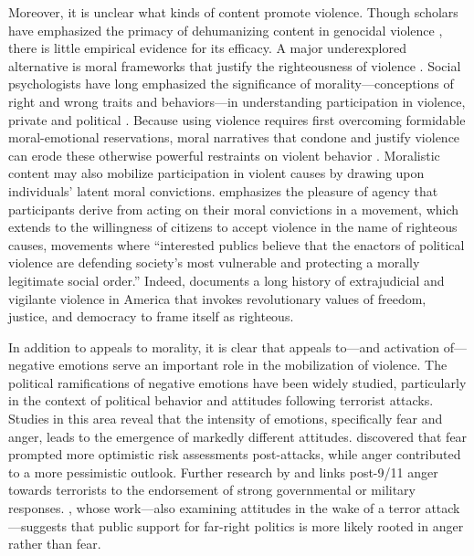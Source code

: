 Moreover, it is unclear what kinds of content promote violence. Though scholars have emphasized the primacy of dehumanizing content in genocidal violence \citep{fein1979accounting, charny1982can}, there is little empirical evidence for its efficacy. A major underexplored alternative is moral frameworks that justify the righteousness of violence \citep{viterna2014radical, javed2022righteous}. Social psychologists have long emphasized the significance of morality---conceptions of right and wrong traits and behaviors---in understanding participation in violence, private and political \citep{bandura1975disinhibition,baumeister1999evil,beck1999prisoners,fiske2014virtuous}. Because using violence requires first overcoming formidable moral-emotional reservations, moral narratives that condone and justify violence can erode these otherwise powerful restraints on violent behavior \citep{baumeister1999evil,beck1999prisoners,fincher2016perceptual}. Moralistic content may also mobilize participation in violent causes by drawing upon individuals' latent moral convictions. \cite{wood2003insurgent} emphasizes the pleasure of agency that participants derive from acting on their moral convictions in a movement, which \cite{viterna2014radical} extends to the willingness of citizens to accept violence in the name of righteous causes, movements where ``interested publics believe that the enactors of political violence are defending society's most vulnerable and protecting a morally legitimate social order.'' Indeed, \cite{kirkpatrick2008uncivil} documents a long history of extrajudicial and vigilante violence in America that invokes revolutionary values of freedom, justice, and democracy to frame itself as righteous.

In addition to appeals to morality, it is clear that appeals to---and activation of---negative emotions serve an important role in the mobilization of violence. The political ramifications of negative emotions have been widely studied, particularly in the context of political behavior and attitudes following terrorist attacks. Studies in this area reveal that the intensity of emotions, specifically fear and anger, leads to the emergence of markedly different attitudes. \cite{lerner2003effects} discovered that fear prompted more optimistic risk assessments post-attacks, while anger contributed to a more pessimistic outlook. Further research by \cite{huddy2011americans} and \cite{skitka2006confrontational} links post-9/11 anger towards terrorists to the endorsement of strong governmental or military responses. \cite{vasilopoulos2019fear}, whose work---also examining attitudes in the wake of a terror attack---suggests that public support for far-right politics is more likely rooted in anger rather than fear.

